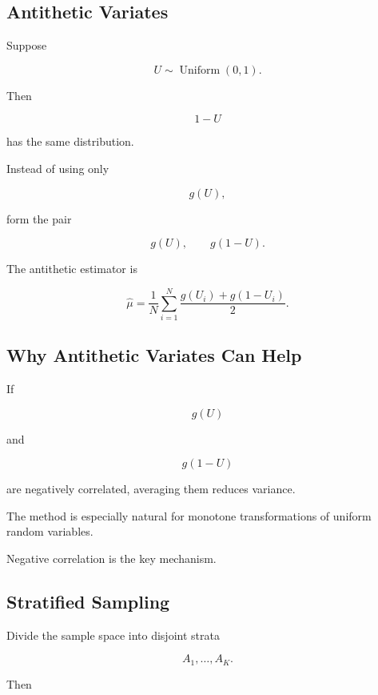 \subsection{Antithetic Variates}
\label{subsec:antithetic-variates}

Suppose

\[
U\sim\operatorname{Uniform}(0,1).
\]

Then

\[
1-U
\]

has the same distribution.

Instead of using only

\[
g(U),
\]

form the pair

\[
\boxed{
g(U),
\qquad
g(1-U).
}
\]

The antithetic estimator is

\[
\boxed{
\widehat{\mu}
=
\frac1N
\sum_{i=1}^{N}
\frac{
g(U_i)+g(1-U_i)
}{
2
}.
}
\]

\subsection{Why Antithetic Variates Can Help}
\label{subsec:why-antithetic-helps}

If

\[
g(U)
\]

and

\[
g(1-U)
\]

are negatively correlated, averaging them reduces variance.

The method is especially natural for monotone transformations of uniform
random variables.

Negative correlation is the key mechanism.

\subsection{Stratified Sampling}
\label{subsec:stratified-sampling}

Divide the sample space into disjoint strata

\[
A_1,\ldots,A_K.
\]

Then


